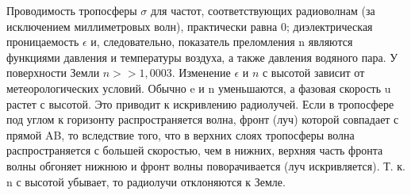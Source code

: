 \documentclass[a4paper,12pt]{article} %
\begin{document}
Проводимость тропосферы \(\sigma\) для частот, соответствующих радиоволнам (за исключением миллиметровых волн), практически равна \(0\); диэлектрическая проницаемость \(\epsilon\) и, следовательно, показатель преломления n являются функциями давления и температуры воздуха, а также давления водяного пара. У поверхности Земли \(n >> 1,0003\). Изменение \(\epsilon\) и \(n\) с высотой зависит от метеорологических условий. Обычно e и n уменьшаются, а фазовая скорость u растет с высотой. Это приводит к искривлению радиолучей. Если в тропосфере под углом к горизонту распространяется волна,  фронт (луч) которой совпадает с прямой AB, то вследствие того, что в верхних слоях тропосферы волна распространяется с большей скоростью, чем в нижних, верхняя часть фронта волны обгоняет нижнюю и фронт волны поворачивается (луч искривляется). Т. к. n с высотой убывает, то радиолучи отклоняются к Земле. 
\end{document}
